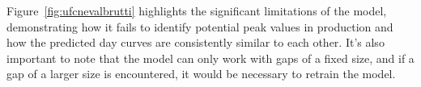 


Figure~\ref{fig:ufcnevalbrutti} highlights the significant limitations
of the model, demonstrating how it fails to identify potential peak
values in production and how the predicted day curves are consistently similar
to each other.
It's also important to note that the model can only work with
gaps of a fixed size, and if a gap of a larger size is encountered,
it would be necessary to retrain the model.

